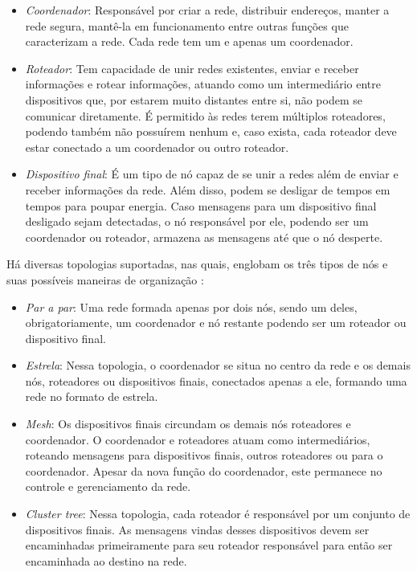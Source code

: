 \documentclass[
	article,			%
	11pt,				%
	oneside,			%
	a4paper,			%
	section=TITLE,		%
	subsection=TITLE,	%
	english,			%
	brazil,				%
	sumario=tradicional
	]{abntex2}
\begin{document}
\begin{itemize} \parskip -4pt
	\item \textit{Coordenador}: Responsável por criar a rede, distribuir endereços, manter a rede segura, 
	mantê-la em funcionamento entre outras funções que caracterizam a rede. Cada rede tem um e 
	apenas um coordenador.
	\item \textit{Roteador}: Tem capacidade de unir redes existentes, enviar e receber informações e rotear 
	informações, atuando como um intermediário entre dispositivos que, por estarem muito distantes 
	entre si, não podem se comunicar diretamente. É permitido às redes terem múltiplos roteadores, 
	podendo também não possuírem nenhum e, caso exista, cada roteador deve estar conectado a um 
	coordenador ou outro roteador.
	\item \textit{Dispositivo final}: É um tipo de nó capaz de se unir a redes além de enviar e receber 
	informações da rede. Além disso, podem se desligar de tempos em tempos para poupar energia. 
	Caso mensagens para um dispositivo final desligado sejam detectadas, o nó responsável por ele, 
	podendo ser um coordenador ou roteador, armazena as mensagens até que o nó desperte.
\end{itemize}

Há diversas topologias suportadas, nas quais, englobam os três tipos de nós e suas possíveis 
maneiras de organização \cite{FALUDI2010}:

\begin{itemize} \parskip -4pt
	\item \textit{Par a par}: Uma rede formada apenas por dois nós, sendo um deles, obrigatoriamente, um 
	coordenador e nó restante podendo ser um roteador ou dispositivo final.
	\item \textit{Estrela}: Nessa topologia, o coordenador se situa no centro da rede e os demais nós, 
	roteadores ou dispositivos finais, conectados apenas a ele, formando uma rede no formato de 
	estrela.
	\item \textit{Mesh}: Os dispositivos finais circundam os demais nós roteadores e coordenador. O 
	coordenador e roteadores atuam como intermediários, roteando mensagens para dispositivos 
	finais, outros roteadores ou para o coordenador. Apesar da nova função do coordenador, este 
	permanece no controle e gerenciamento da rede.
	\item \textit{Cluster tree}: Nessa topologia, cada roteador é responsável por um conjunto de 
	dispositivos finais. As mensagens vindas desses dispositivos devem ser encaminhadas 
	primeiramente para seu roteador responsável para então ser encaminhada ao destino na rede.
\end{itemize}
\end{document}
